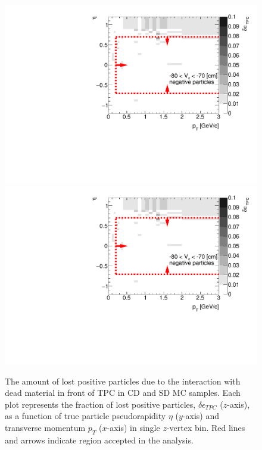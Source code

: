 \begin{figure}[H]
	\caption[The amount of lost positive particles due to the interaction with dead material in front of TPC as a function of $p_T$, $\eta$ and $z$-vertex in CD and SD]{The amount of lost positive particles due to the interaction with dead material in front of TPC in CD and SD MC samples. Each plot represents the fraction of lost positive particles, $\delta\epsilon_{ TPC}$ ($z$-axis), as a function of true particle pseudorapidity $\eta$ ($y$-axis) and transverse momentum $p_{T}$ ($x$-axis) in single $z$-vertex bin. Red lines and arrows indicate region accepted in the analysis.}\label{fig:dead_materialCDSD3Dpositive}
	\parbox{0.325\textwidth}{
		\includegraphics[width=\linewidth,page=17]{graphics/systematicsEfficiency/deadMaterial/secondaries_Unbinned_Charged_SDCD.pdf}\\
		\includegraphics[width=\linewidth,page=20]{graphics/systematicsEfficiency/deadMaterial/secondaries_Unbinned_Charged_SDCD.pdf}\\
}
\end{figure}
